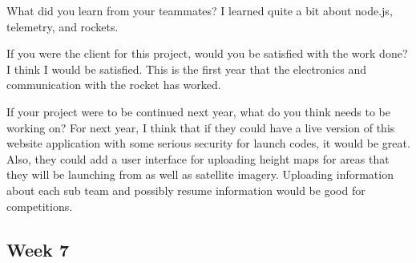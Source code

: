 \documentclass[10pt,draftclsnofoot,onecolumn]{IEEEtran}
\begin{document}
\begin{itemize}
	What did you learn from your teammates? I learned quite a bit about node.js, telemetry, and rockets.

	If you were the client for this project, would you be satisfied with the work done? I think I would be satisfied. This is the first year that the electronics and communication with the rocket has worked.

	If your project were to be continued next year, what do you think needs to be working on? For next year, I think that if they could have a live version of this website application with some serious security for launch codes, it would be great. Also, they could add a user interface for uploading height maps for areas that they will be launching from as well as satellite imagery. Uploading information about each sub team and possibly resume information would be good for competitions.
\end{itemize}

\subsection{Week 7}
\end{document}
